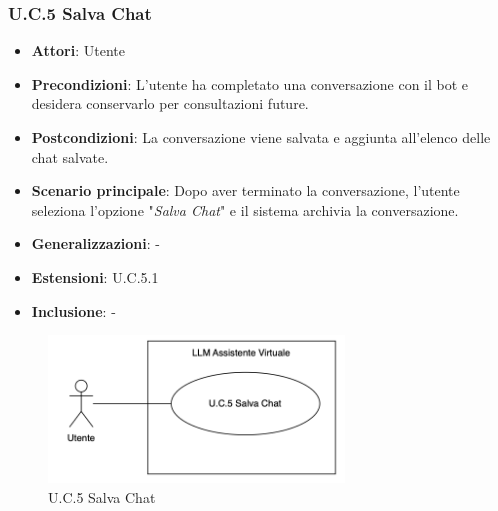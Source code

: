 \subsubsection{U.C.5 Salva Chat}
\begin{itemize}
    \item \textbf{Attori}: Utente
    \item \textbf{Precondizioni}: L'utente ha completato una conversazione con il bot e desidera conservarlo per consultazioni future. 
    \item \textbf{Postcondizioni}: La conversazione viene salvata e aggiunta all'elenco delle chat salvate.
    \item \textbf{Scenario principale}: Dopo aver terminato la conversazione, l'utente seleziona l'opzione "\textit{Salva Chat}" e il sistema archivia la conversazione.
    \item \textbf{Generalizzazioni}: -
    \item \textbf{Estensioni}: U.C.5.1
    \item \textbf{Inclusione}: -
\end{itemize}
\begin{figure}[H]
    \centering
    \includegraphics[width=0.7\textwidth]{img/UC5.png}
    \caption{U.C.5 Salva Chat}
\end{figure}
\newpage

